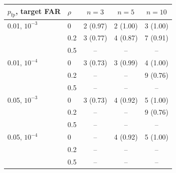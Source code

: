 \begin{tabular}{llccc}
\toprule
$p_{\mathrm{fp}}$, target FAR & $\rho$ & $n=3$ & $n=5$ & $n=10$ \\
\midrule
0.01, $10^{-3}$ & 0 & 2 (0.97) & 2 (1.00) & 3 (1.00) \\
 & 0.2 & 3 (0.77) & 4 (0.87) & 7 (0.91) \\
 & 0.5 & -- & -- & -- \\
\midrule
0.01, $10^{-4}$ & 0 & 3 (0.73) & 3 (0.99) & 4 (1.00) \\
 & 0.2 & -- & -- & 9 (0.76) \\
 & 0.5 & -- & -- & -- \\
\midrule
0.05, $10^{-3}$ & 0 & 3 (0.73) & 4 (0.92) & 5 (1.00) \\
 & 0.2 & -- & -- & 9 (0.76) \\
 & 0.5 & -- & -- & -- \\
\midrule
0.05, $10^{-4}$ & 0 & -- & 4 (0.92) & 5 (1.00) \\
 & 0.2 & -- & -- & -- \\
 & 0.5 & -- & -- & -- \\
\bottomrule
\end{tabular}